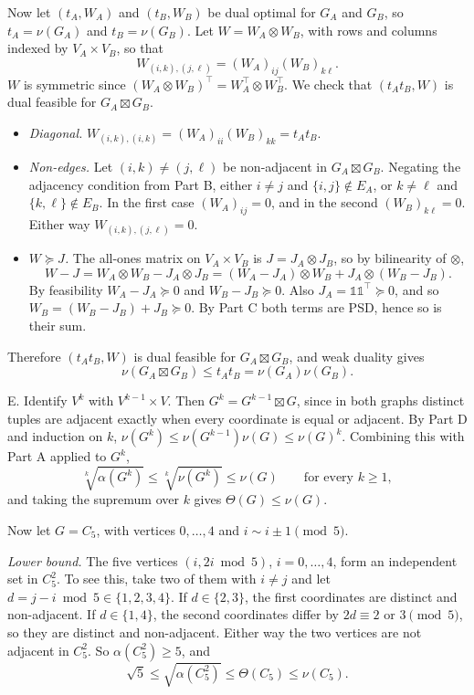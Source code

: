 \documentclass[11pt,letterpaper]{article}
\theoremstyle{definition}
\newcommand{\One}{\mathds{1}}
\begin{document}
Now let $(t_A, W_A)$ and $(t_B, W_B)$ be dual optimal for $G_A$ and $G_B$, so $t_A = \nu(G_A)$ and $t_B = \nu(G_B)$.
Let $W = W_A\otimes W_B$, with rows and columns indexed by $V_A\times V_B$, so that
\[
W_{(i,k),(j,\ell)} = (W_A)_{ij}(W_B)_{k\ell}.
\]
$W$ is symmetric since $(W_A\otimes W_B)^\top = W_A^\top\otimes W_B^\top$. We check that $(t_At_B, W)$ is dual feasible for $G_A\boxtimes G_B$.
\begin{itemize}
\item \emph{Diagonal.} $W_{(i,k),(i,k)} = (W_A)_{ii}(W_B)_{kk} = t_At_B$.
\item \emph{Non-edges.} Let $(i,k)\neq(j,\ell)$ be non-adjacent in $G_A\boxtimes G_B$. Negating the adjacency condition from Part B, either $i\neq j$ and $\{i,j\}\notin E_A$, or $k\neq\ell$ and $\{k,\ell\}\notin E_B$. In the first case $(W_A)_{ij} = 0$, and in the second $(W_B)_{k\ell} = 0$. Either way $W_{(i,k),(j,\ell)} = 0$.
\item \emph{$W\succeq J$.} The all-ones matrix on $V_A\times V_B$ is $J = J_A\otimes J_B$, so by bilinearity of $\otimes$,
\[
W - J = W_A\otimes W_B - J_A\otimes J_B = (W_A - J_A)\otimes W_B + J_A\otimes(W_B - J_B).
\]
By feasibility $W_A - J_A\succeq 0$ and $W_B - J_B\succeq 0$. Also $J_A = \One\One^\top\succeq 0$, and so $W_B = (W_B - J_B) + J_B\succeq 0$. By Part C both terms are PSD, hence so is their sum.
\end{itemize}
Therefore $(t_At_B, W)$ is dual feasible for $G_A\boxtimes G_B$, and weak duality gives
\[
\nu(G_A\boxtimes G_B) \leq t_At_B = \nu(G_A)\nu(G_B).
\]

E.
Identify $V^k$ with $V^{k-1}\times V$. Then $G^k = G^{k-1}\boxtimes G$, since in both graphs distinct tuples are adjacent exactly when every coordinate is equal or adjacent.
By Part D and induction on $k$, $\nu(G^k)\leq\nu(G^{k-1})\nu(G)\leq\nu(G)^k$.
Combining this with Part A applied to $G^k$,
\[
\sqrt[k]{\alpha(G^k)} \leq \sqrt[k]{\nu(G^k)} \leq \nu(G) \qquad\text{for every } k\geq 1,
\]
and taking the supremum over $k$ gives $\Theta(G)\leq\nu(G)$.

Now let $G = C_5$, with vertices $0,\dots,4$ and $i\sim i\pm 1 \pmod 5$.

\emph{Lower bound.} The five vertices $(i, 2i \bmod 5)$, $i = 0,\dots,4$, form an independent set in $C_5^2$.
To see this, take two of them with $i\neq j$ and let $d = j - i \bmod 5\in\{1,2,3,4\}$.
If $d\in\{2,3\}$, the first coordinates are distinct and non-adjacent.
If $d\in\{1,4\}$, the second coordinates differ by $2d\equiv 2$ or $3\pmod 5$, so they are distinct and non-adjacent.
Either way the two vertices are not adjacent in $C_5^2$. So $\alpha(C_5^2)\geq 5$, and
\[
\sqrt5 \leq \sqrt{\alpha(C_5^2)} \leq \Theta(C_5) \leq \nu(C_5).
\]
\end{document}
